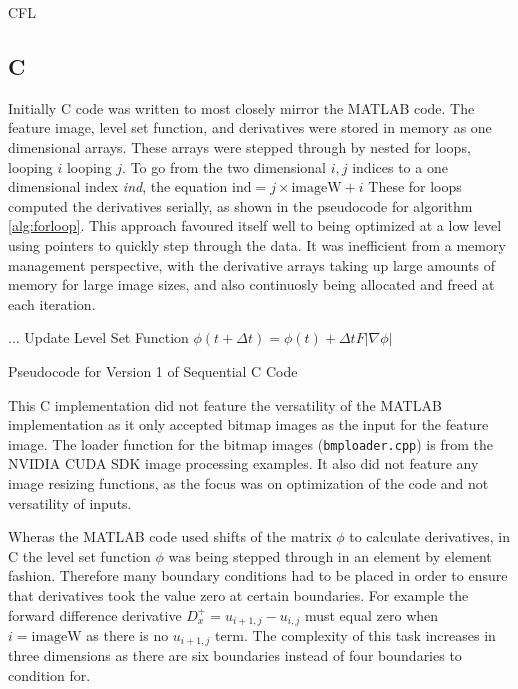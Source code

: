 CFL

	\subsection{C}
Initially C code was written to most closely mirror the MATLAB code. The feature image, level set function, and derivatives were stored in memory as one dimensional arrays. These arrays were stepped through by nested for loops, looping $i$ looping $j$. To go from the two dimensional $i,j$ indices to a one dimensional index \textit{ind}, the equation $\textrm{ind} = j \times \textrm{imageW} +i$ These for loops computed the derivatives serially, as shown in the pseudocode for algorithm \ref{alg:forloop}. This approach favoured itself well to being optimized at a low level using pointers to quickly step through the data. It was inefficient from a memory management perspective, with the derivative arrays taking up large amounts of memory for large image sizes, and also continuosly being allocated and freed at each iteration.

\begin{algorithm}[h]
\dontprintsemicolon
{}
\BlankLine
...\;
\BlankLine
Update Level Set Function $\phi(t+\Delta t) =\phi(t) + \Delta t F|\nabla\phi|$\;
\caption{Pseudocode for Version 1 of Sequential C Code}\label{alg:forloop}
\end{algorithm}

This C implementation did not feature the versatility of the MATLAB implementation as it only accepted bitmap images as the input for the feature image. The loader function for the bitmap images (\texttt{bmploader.cpp}) is from the NVIDIA CUDA SDK image processing examples. It also did not feature any image resizing functions, as the focus was on optimization of the code and not versatility of inputs.

Wheras the MATLAB code used shifts of the matrix $\phi$ to calculate derivatives, in C the level set function $\phi$ was being stepped through in an element by element fashion. Therefore many boundary conditions had to be placed in order to ensure that derivatives took the value zero at certain boundaries. For example the forward difference derivative $D_x^+ =u_{i+1,j}-u_{i,j}$ must equal zero when $i=\textrm{imageW}$ as there is no $u_{i+1,j}$ term. The complexity of this task increases in three dimensions as there are six boundaries instead of four boundaries to condition for.


